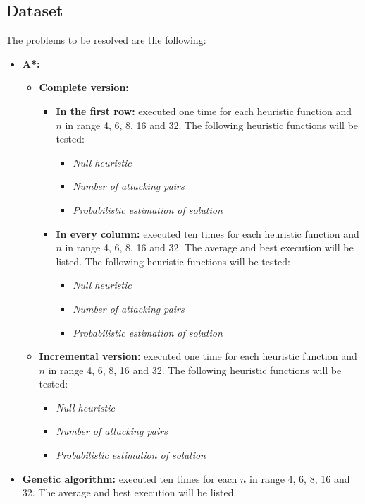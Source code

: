 \documentclass[]{llncs}
\begin{document}
\subsection{Dataset}\label{dataset}
The problems to be resolved are the following:
\begin{itemize}
    \item \textbf{A*:}
    \begin{itemize}
        \item \textbf{Complete version:}
        \begin{itemize}
            \item \textbf{In the first row:} executed one time for each heuristic function and $n$ in range 4, 6, 8, 16 and 32. The following heuristic functions will be tested:
            \begin{itemize}
                \item \textit{Null heuristic}
                \item \textit{Number of attacking pairs}
                \item \textit{Probabilistic estimation of solution}
            \end{itemize}
            \item \textbf{In every column:} executed ten times for each heuristic function and $n$ in range 4, 6, 8, 16 and 32. The average and best execution will be listed. The following heuristic functions will be tested:
            \begin{itemize}
                \item \textit{Null heuristic}
                \item \textit{Number of attacking pairs}
                \item \textit{Probabilistic estimation of solution}
            \end{itemize}
        \end{itemize}
        \item \textbf{Incremental version:} executed one time for each heuristic function and $n$ in range 4, 6, 8, 16 and 32. The following heuristic functions will be tested:
        \begin{itemize}
            \item \textit{Null heuristic}
            \item \textit{Number of attacking pairs}
            \item \textit{Probabilistic estimation of solution}
        \end{itemize}
    \end{itemize}
    \item \textbf{Genetic algorithm:} executed ten times for each $n$ in range 4, 6, 8, 16 and 32. The average and best execution will be listed.
\end{itemize}
\end{document}
